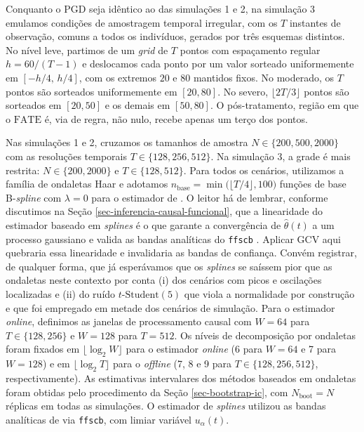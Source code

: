 Conquanto o PGD seja idêntico ao das simulações 1 e 2, na simulação 3 emulamos condições de amostragem temporal irregular, com os \(T\) instantes de observação, comuns a todos os indivíduos, gerados por três esquemas distintos. 
No nível leve, partimos de um \emph{grid} de \(T\) pontos com espaçamento regular \(h = 60/(T-1)\) e deslocamos cada ponto por um valor sorteado uniformemente em \([-h/4,\, h/4]\), com os extremos \(20\) e \(80\) mantidos fixos. 
No moderado, os \(T\) pontos são sorteados uniformemente em \([20, 80]\). 
No severo, \(\lfloor 2T/3 \rfloor\) pontos são sorteados em \([20, 50]\) e os demais em \([50, 80]\). 
O pós-tratamento, região em que o \(\mathrm{FATE}\) é, via de regra, não nulo, recebe apenas um terço dos pontos.

Nas simulações 1 e 2, cruzamos os tamanhos de amostra \(N \in \{200, 500, 2000\}\) com as resoluções temporais \(T \in \{128, 256, 512\}\). 
Na simulação 3, a grade é mais restrita: \(N \in \{200, 2000\}\) e \(T \in \{128, 512\}\). 
Para todos os cenários, utilizamos a família de ondaletas Haar e adotamos \(n_{\mathrm{base}} = \min\bigl(\lfloor T/4 \rfloor, 100\bigr)\) funções de base B-\emph{spline} com \(\lambda = 0\) para o estimador de .
O leitor há de lembrar, conforme discutimos na Seção \ref{sec-inferencia-causal-funcional}, que a linearidade do estimador baseado em \emph{splines} é o que garante a convergência de \(\hat{\theta}(t)\) a um processo gaussiano e valida as bandas analíticas do \texttt{ffscb} \cite{lieblFastFairSimultaneous2023}. 
Aplicar GCV aqui quebraria essa linearidade e invalidaria as bandas de confiança. 
Convém registrar, de qualquer forma, que já esperávamos que os \emph{splines} se saíssem pior que as ondaletas neste contexto por conta (i) dos cenários com picos e oscilações localizadas e (ii) do ruído \(t\text{-Student}(5)\) que viola a normalidade por construção e que foi empregado em metade dos cenários de simulação.
Para o estimador \emph{online}, definimos as janelas de processamento causal com \(W = 64\) para \(T \in \{128, 256\}\) e \(W = 128\) para \(T = 512\).
Os níveis de decomposição por ondaletas foram fixados em \(\lfloor \log_2 W \rfloor\) para o estimador \emph{online} (6 para \(W = 64\) e 7 para \(W = 128\)) e em \(\lfloor \log_2 T \rfloor\) para o \emph{offline} (7, 8 e 9 para \(T \in \{128, 256, 512\}\), respectivamente).
As estimativas intervalares dos métodos baseados em ondaletas foram obtidas pelo procedimento da Seção \ref{sec-bootstrap-ic}, com \(N_{\mathrm{boot}} = N\) réplicas em todas as simulações. 
O estimador de \emph{splines} utilizou as bandas analíticas de  via \texttt{ffscb}, com limiar variável \(u_\alpha(t)\). 

